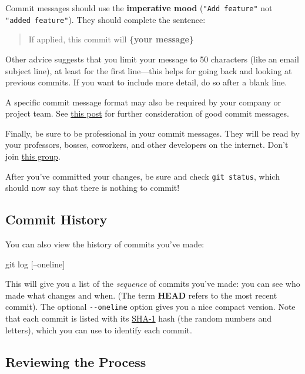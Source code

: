 \documentclass[]{book}
\newenvironment{Shaded}{\begin{snugshade}}{\end{snugshade}}
\newcommand{\FunctionTok}[1]{\textcolor[rgb]{0.00,0.00,0.00}{#1}}
\newcommand{\NormalTok}[1]{#1}
\theoremstyle{definition}
\theoremstyle{definition}
\theoremstyle{remark}
\begin{document}
Commit messages should use the \textbf{imperative mood}
(\texttt{"Add\ feature"} not \texttt{"added\ feature"}). They should
complete the sentence:

\begin{quote}
If applied, this commit will \textbf{\{your message\}}
\end{quote}

Other advice suggests that you limit your message to 50 characters (like
an email subject line), at least for the first line---this helps for
going back and looking at previous commits. If you want to include more
detail, do so after a blank line.

A specific commit message format may also be required by your company or
project team. See \href{http://chris.beams.io/posts/git-commit/}{this
post} for further consideration of good commit messages.

Finally, be sure to be professional in your commit messages. They will
be read by your professors, bosses, coworkers, and other developers on
the internet. Don't join \href{https://twitter.com/gitlost}{this group}.

After you've committed your changes, be sure and check
\texttt{git\ status}, which should now say that there is nothing to
commit!

\subsection{Commit History}\label{commit-history}

You can also view the history of commits you've made:

\begin{Shaded}
\begin{Highlighting}[]
\FunctionTok{git}\NormalTok{ log [--oneline]}
\end{Highlighting}
\end{Shaded}

This will give you a list of the \emph{sequence} of commits you've made:
you can see who made what changes and when. (The term \textbf{HEAD}
refers to the most recent commit). The optional \texttt{-\/-oneline}
option gives you a nice compact version. Note that each commit is listed
with its \href{https://en.wikipedia.org/wiki/SHA-1}{SHA-1} hash (the
random numbers and letters), which you can use to identify each commit.

\subsection{Reviewing the Process}\label{reviewing-the-process}
\end{document}
